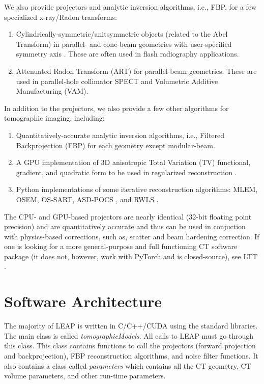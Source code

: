 \documentclass[11pt]{article}
\begin{document}
We also provide projectors and analytic inversion algorithms, i.e., FBP, for a few specialized x-ray/Radon transforms:
\begin{enumerate}
\item Cylindrically-symmetric/anitsymmetric objects (related to the Abel Transform) in parallel- and cone-beam geometries with user-specified symmetry axis \cite{ChampleyMaddox_Optica_2021}. These are often used in flash radiography applications.
\item Attenuated Radon Transform (ART) for parallel-beam geometries. These are used in parallel-hole collimator SPECT and Volumetric Additive Manufacturing (VAM).
\end{enumerate}

In addition to the projectors, we also provide a few other algorithms for tomographic imaging, including:
\begin{enumerate}
\item Quantitatively-accurate analytic inversion algorithms, i.e., Filtered Backprojection (FBP) for each geometry except modular-beam.
\item A GPU implementation of 3D anisotropic Total Variation (TV) functional, gradient, and quadratic form to be used in regularized reconstruction \cite{Yu_MIC_2006}.
\item Python implementations of some iterative reconstruction algorithms: MLEM, OSEM, OS-SART, ASD-POCS \cite{ASDPOCS_PMB_2008}, and RWLS \cite{Hager_Zhang_CG_2005, Fessler_TIP_1999, Yu_MIC_2006}.
\end{enumerate}

The CPU- and GPU-based projectors are nearly identical (32-bit floating point precision) and are quantitatively accurate and thus can be used in conjuction with physics-based corrections, such as, scatter and beam hardening correction. If one is looking for a more general-purpose and full functioning CT software package (it does not, however, work with PyTorch and is closed-source), see LTT \cite{ChampleyLTT}.

\section{Software Architecture}

The majority of LEAP is written in C/C++/CUDA using the standard libraries.  The main class is called \textit{tomographicModels}.  All calls to LEAP must go through this class.  This class contains functions to call the projectors (forward projection and backprojection), FBP reconstruction algorithms, and noise filter functions.  It also contains a class called \textit{parameters} which contains all the CT geometry, CT volume parameters, and other run-time parameters.
\end{document}

